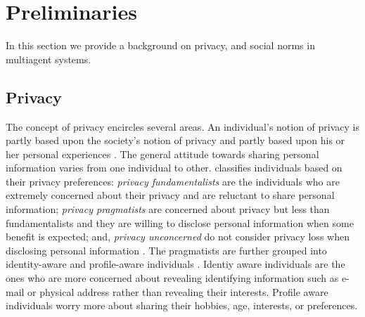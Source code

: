 \documentclass[11pt,          %
               phd,           %
               onehalfspacing %
               ]{ncsuthesis}
\begin{document}


\section{Preliminaries}

In this section we provide a background on privacy, and social norms in
multiagent systems.

\subsection{Privacy}
The concept of privacy encircles several areas. An individual's notion of
privacy is partly based upon the society's notion of privacy and partly
based upon his or her personal experiences \citep{westin1967privacy,
westin2003social}. The general attitude towards sharing personal
information varies from one individual to other.
\citet{westin1967privacy} classifies individuals based on their privacy
preferences: \textit{privacy fundamentalists} are the individuals who
are extremely concerned about their privacy and are reluctant to share
personal information; \textit{privacy pragmatists} are concerned about
privacy but less than fundamentalists and they are willing to disclose
personal information when some benefit is expected; and,
\textit{privacy unconcerned} do not consider privacy loss when
disclosing personal information \citep{westin1967privacy}. The
pragmatists are further grouped into identity-aware and profile-aware
individuals \citep{spiekermann2009enggprivacy}. Identiy aware
individuals are the ones who are more concerned about revealing
identifying information such as e-mail or physical address rather than
revealing their interests. Profile aware individuals worry more about
sharing their hobbies, age, interests, or preferences.
\end{document}
